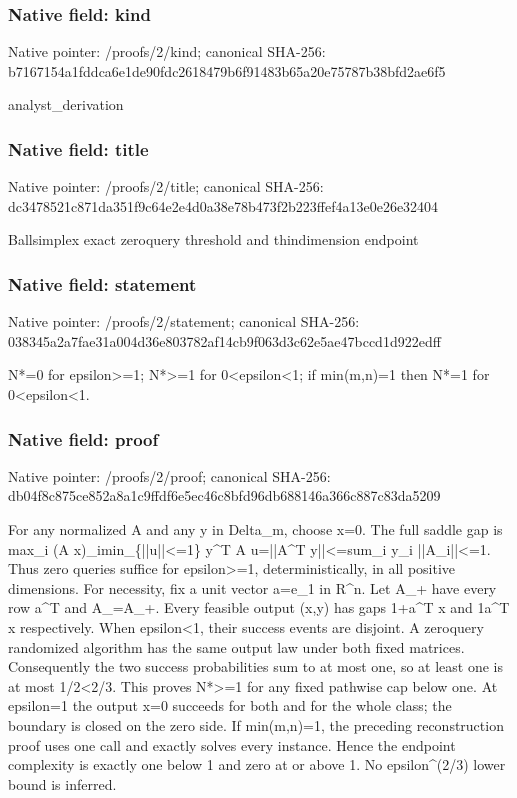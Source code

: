 \documentclass[10pt,a4paper]{article}
\begin{document}
\subsubsection{Native field: kind}


Native pointer: /proofs/2/kind; canonical SHA-256: b7167154a1fddca6e1de90fd\allowbreak{}c2618479b6f91483b65a20e7\allowbreak{}5787b38bfd2ae6f5


analyst\_derivation


\subsubsection{Native field: title}


Native pointer: /proofs/2/title; canonical SHA-256: dc3478521c871da351f9c64e\allowbreak{}2e4d0a38e78b473f2b223ffe\allowbreak{}f4a13e0e26e32404


Ballsimplex exact zeroquery threshold and thindimension endpoint


\subsubsection{Native field: statement}


Native pointer: /proofs/2/statement; canonical SHA-256: 038345a2a7fae31a004d36e8\allowbreak{}03782af14cb9f063d3c62e5a\allowbreak{}e47bccd1d922edff


N*=0 for epsilon>=1; N*>=1 for 0<epsilon<1; if min(m,n)=1 then N*=1 for 0<epsilon<1.


\subsubsection{Native field: proof}


Native pointer: /proofs/2/proof; canonical SHA-256: db04f8c875ce852a8a1c9ffd\allowbreak{}f6e5ec46c8bfd96db688146a\allowbreak{}366c887c83da5209


For any normalized A and any y in Delta\_m, choose x=0. The full saddle gap is max\_i (A x)\_imin\_\{||u||<=1\} y\textasciicircum{}T A u=||A\textasciicircum{}T y||<=sum\_i y\_i ||A\_i||<=1. Thus zero queries suffice for epsilon>=1, deterministically, in all positive dimensions.
For necessity, fix a unit vector a=e\_1 in R\textasciicircum{}n. Let A\_+ have every row a\textasciicircum{}T and A\_=A\_+. Every feasible output (x,y) has gaps 1+a\textasciicircum{}T x and 1a\textasciicircum{}T x respectively. When epsilon<1, their success events are disjoint. A zeroquery randomized algorithm has the same output law under both fixed matrices. Consequently the two success probabilities sum to at most one, so at least one is at most 1/2<2/3. This proves N*>=1 for any fixed pathwise cap below one. At epsilon=1 the output x=0 succeeds for both and for the whole class; the boundary is closed on the zero side. If min(m,n)=1, the preceding reconstruction proof uses one call and exactly solves every instance. Hence the endpoint complexity is exactly one below 1 and zero at or above 1. No epsilon\textasciicircum{}(2/3) lower bound is inferred.
\end{document}
